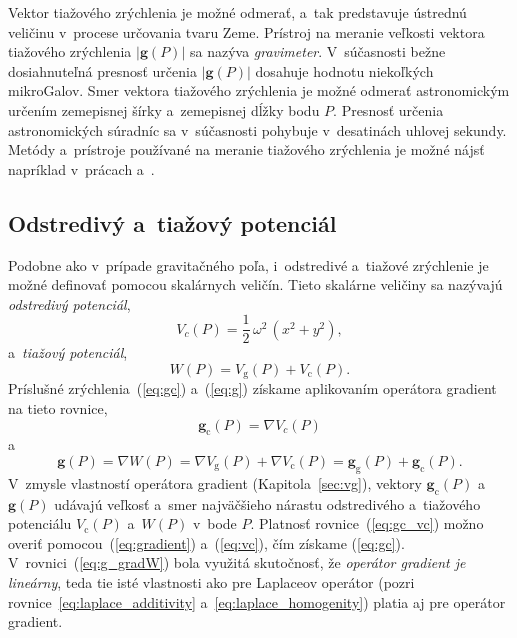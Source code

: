 \documentclass[a4paper, 12pt]{book}
\newcommand{\gidx}{\mathrm g}
\newcommand{\cidx}{\mathrm c}
\let\vec\mathbf
\begin{document}
Vektor tiažového zrýchlenia je možné odmerať, a~tak predstavuje ústrednú
veličinu v~procese určovania tvaru Zeme.  Prístroj na meranie veľkosti vektora
tiažového zrýchlenia $| \vec g(P) |$ sa nazýva \emph{gravimeter}.  V~súčasnosti
bežne dosiahnuteľná presnosť určenia $| \vec g(P) |$ dosahuje hodnotu
niekoľkých mikroGalov.  Smer vektora tiažového zrýchlenia je možné odmerať
astronomickým určením zemepisnej šírky a~zemepisnej dĺžky bodu $P$.  Presnosť
určenia astronomických súradníc sa v~súčasnosti pohybuje v~desatinách uhlovej
sekundy.  Metódy a~prístroje používané na meranie tiažového zrýchlenia je možné
nájsť napríklad v~prácach \cite{Torge1989} a~\cite{Janak2010}.






\subsection{Odstredivý a~tiažový potenciál}

Podobne ako v~prípade gravitačného poľa, i~odstredivé a~tiažové zrýchlenie je
možné definovať pomocou skalárnych veličín.  Tieto skalárne veličiny sa
nazývajú \emph{odstredivý potenciál},
%
\begin{equation}
\label{eq:vc}
V_c(P) = \frac{1}{2} \, \omega^2 \, (x^2 + y^2){,}
\end{equation}
%
a~\emph{tiažový potenciál},
%
\begin{equation}
\label{eq:w}
W(P) = V_\gidx(P) + V_\cidx(P){.}
\end{equation}
%
Príslušné zrýchlenia~(\ref{eq:gc}) a~(\ref{eq:g}) získame aplikovaním operátora
gradient na tieto rovnice,
%
\begin{equation}
\label{eq:gc_vc}
\vec g_\cidx(P) = \nabla V_c(P)
\end{equation}
%
a
%
\begin{equation}
\label{eq:g_gradW}
\vec g(P) = \nabla W(P) = \nabla V_\gidx(P) + \nabla V_\cidx(P) = \vec
g_\gidx(P) + \vec g_\cidx(P){.}
\end{equation}
%
V~zmysle vlastností operátora gradient (Kapitola~\ref{sec:vg}), vektory $\vec
g_\cidx(P)$ a~$\vec g(P)$ udávajú veľkosť a~smer najväčšieho nárastu
odstredivého a~tiažového potenciálu $V_\cidx(P)$ a~$W(P)$ v~bode $P$.  Platnosť
rovnice~(\ref{eq:gc_vc}) možno overiť pomocou~(\ref{eq:gradient})
a~(\ref{eq:vc}), čím získame (\ref{eq:gc}).  V~rovnici~(\ref{eq:g_gradW}) bola
využitá skutočnosť, že \emph{operátor gradient je lineárny}, teda tie isté
vlastnosti ako pre Laplaceov operátor (pozri
rovnice~\ref{eq:laplace_additivity} a~\ref{eq:laplace_homogenity}) platia aj
pre operátor gradient.
\end{document}

